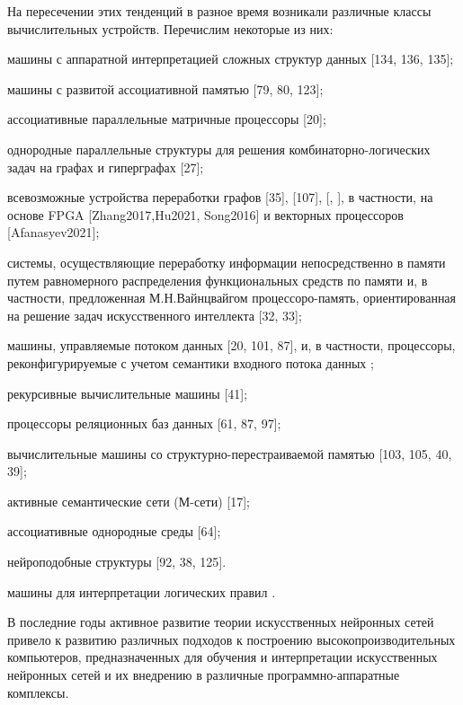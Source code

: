 На пересечении этих тенденций в разное время возникали различные классы вычислительных устройств. Перечислим некоторые из них:
\begin{textitemize}
\item машины с аппаратной интерпретацией сложных структур данных [134, 136, 135];
\item машины с развитой ассоциативной памятью [79, 80, 123];
\item ассоциативные параллельные матричные процессоры [20];
\item однородные параллельные структуры для решения комбинаторно-логических задач на графах и гиперграфах [27];
\item всевозможные устройства переработки графов [35], [107], [, ], в частности, на основе FPGA [Zhang2017,Hu2021, Song2016] и векторных процессоров [Afanasyev2021];
\item системы, осуществляющие переработку информации непосредственно в памяти путем равномерного распределения функциональных средств по памяти и, в частности, предложенная М.Н.Вайнцвайгом процессоро-память, ориентированная на решение задач искусственного интеллекта [32, 33];
\item машины, управляемые потоком данных [20, 101, 87], и, в частности, процессоры, реконфигурируемые с учетом семантики входного потока данных ;
\item рекурсивные вычислительные машины [41];
\item процессоры реляционных баз данных [61, 87, 97];
\item вычислительные машины со структурно-перестраиваемой памятью [103, 105, 40, 39];
\item активные семантические сети (М-сети) [17];
\item ассоциативные однородные среды [64];
\item нейроподобные структуры [92, 38, 125].
\item машины для интерпретации логических правил .
\end{textitemize}

В последние годы активное развитие теории искусственных нейронных сетей привело к развитию различных подходов к построению высокопроизводительных компьютеров, предназначенных для обучения и интерпретации искусственных нейронных сетей \cite{Neurocomputers,USB_Accelerator,Moussa_2013} и их внедрению в различные программно-аппаратные комплексы. 

